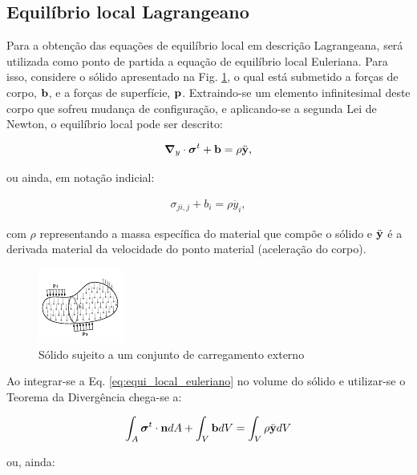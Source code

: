 \documentclass[tese_patricia]{subfiles}
\begin{document}
\subsection{Equilíbrio local Lagrangeano}

Para a obtenção das equações de equilíbrio local em descrição Lagrangeana, será utilizada como ponto de partida a equação de equilíbrio local Euleriana. Para isso, considere o sólido apresentado na Fig. \ref{fig:sol_cargas}, o qual está submetido a forças de corpo, $\mathbf{b}$, e a forças de superfície, $\mathbf{p}$. Extraindo-se um elemento infinitesimal deste corpo que sofreu mudança de configuração, e aplicando-se a segunda Lei de Newton, o  equilíbrio local pode ser descrito:

\begin{align}
	\boldsymbol{\nabla}_y \cdot \boldsymbol{\sigma}^{t} + \mathbf{b} = \rho  \ddot{\mathbf{y}}, \label{eq:equi_local_euleriano}
\end{align}

\noindent ou ainda, em notação indicial:

\begin{align}
	\sigma_{ji,j} + b_i  = \rho  \ddot{y_i},
\end{align}

\noindent com $\rho$ representando a massa específica do material que compõe o sólido e $\ddot{\mathbf{y}}$ é a derivada material da velocidade do ponto material (aceleração do corpo).

\begin{figure}[htb!]
	\centering
	\includegraphics[scale=4,trim=0cm 0.0cm 0cm 0cm, clip=true]{Imagens/Cap4/sol_cargas.pdf}	
	\caption{Sólido sujeito a um conjunto de carregamento externo}
	\label{fig:sol_cargas}
\end{figure}

Ao integrar-se a Eq. \ref{eq:equi_local_euleriano} no volume do sólido e utilizar-se o Teorema da Divergência chega-se a:

\begin{align}
	\int_{A} {\boldsymbol{\sigma}}^{t} \cdot \mathbf{n} dA + \int_{V} \mathbf{b} dV = \int_{V} \rho  \ddot{\mathbf{y}} dV \label{eq:eq_global_euleriano}
\end{align}

\noindent ou, ainda:
\end{document}

